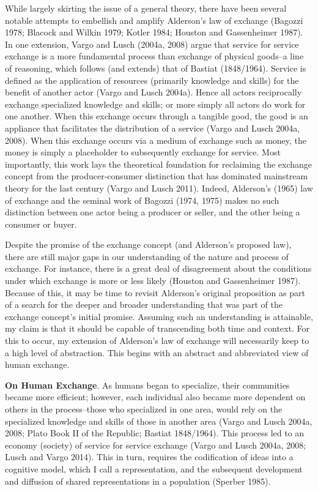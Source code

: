 While largely skirting the issue of a general theory, there have been several notable attempts to embellish and amplify Alderson's law of exchange (Bagozzi 1978; Blacock and Wilkin 1979; Kotler 1984; Houston and Gassenheimer 1987). In one extension, Vargo and Lusch (2004a, 2008) argue that service for service exchange is a more fundamental process than exchange of physical goods--a line of reasoning, which follows (and extends) that of Bastiat (1848/1964). Service is defined as the application of resources (primarily knowledge and skills) for the benefit of another actor (Vargo and Lusch 2004a). Hence all actors reciprocally exchange specialized knowledge and skills; or more simply all actors do work for one another. When this exchange occurs through a tangible good, the good is an appliance that facilitates the distribution of a service (Vargo and Lusch 2004a, 2008). When this exchange occurs via a medium of exchange such as money, the money is simply a placeholder to subsequently exchange for service. Most importantly, this work lays the theoretical foundation for reclaiming the exchange concept from the producer-consumer distinction that has dominated mainstream theory for the last century (Vargo and Lusch 2011). Indeed, Alderson's (1965) law of exchange and the seminal work of Bagozzi (1974, 1975) makes no such distinction between one actor being a producer or seller, and the other being a consumer or buyer. 

Despite the promise of the exchange concept (and Alderson's proposed law), there are still major gaps in our understanding of the nature and process of exchange. For instance, there is a great deal of disagreement about the conditions under which exchange is more or less likely (Houston and Gassenheimer 1987). Because of this, it may be time to revisit Alderson's original proposition as part of a search for the deeper and broader understanding that was part of the exchange concept's initial promise. Assuming such an understanding is attainable, my claim is that it should be capable of transcending both time and context. For this to occur, my extension of Alderson's law of exchange will necessarily keep to a high level of abstraction. This begins with an abstract and abbreviated view of human exchange. 

\textbf{On Human Exchange}.
As humans began to specialize, their communities became more efficient; however, each individual also became more dependent on others in the process--those who specialized in one area, would rely on the specialized knowledge and skills of those in another area (Vargo and Lusch 2004a, 2008; Plato Book II of the Republic; Bastiat 1848/1964). This process led to an economy (society) of service for service exchange (Vargo and Lusch 2004a, 2008; Lusch and Vargo 2014). This in turn, requires the codification of ideas into a cognitive model, which I call a representation, and the subsequent development and diffusion of shared representations in a population (Sperber 1985). 

